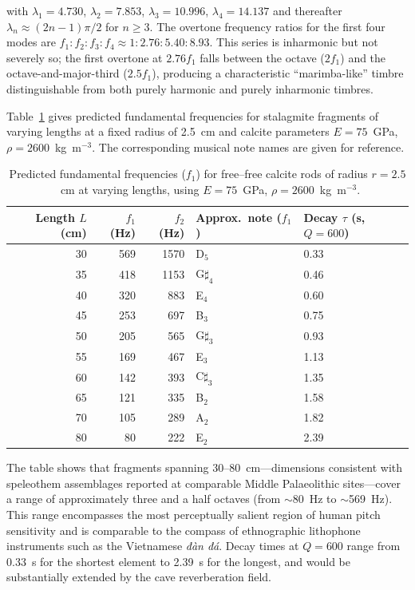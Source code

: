 \documentclass[12pt]{article}
\begin{document}
with $\lambda_1 = 4.730$, $\lambda_2 = 7.853$, $\lambda_3 = 10.996$, $\lambda_4 = 14.137$ and thereafter $\lambda_n \approx (2n-1)\pi/2$ for $n \geq 3$. The overtone frequency ratios for the first four modes are $f_1 : f_2 : f_3 : f_4 \approx 1 : 2.76 : 5.40 : 8.93$. This series is inharmonic but not severely so; the first overtone at $2.76f_1$ falls between the octave ($2f_1$) and the octave-and-major-third ($2.5f_1$), producing a characteristic ``marimba-like'' timbre distinguishable from both purely harmonic and purely inharmonic timbres.

Table~\ref{tab:freq} gives predicted fundamental frequencies for stalagmite fragments of varying lengths at a fixed radius of 2.5~cm and calcite parameters $E = 75$~GPa, $\rho = 2600$~kg~m$^{-3}$. The corresponding musical note names are given for reference.

\begin{table}[h]
\centering
\caption{Predicted fundamental frequencies ($f_1$) for free--free calcite rods of radius $r = 2.5$~cm at varying lengths, using $E = 75$~GPa, $\rho = 2600$~kg~m$^{-3}$.}
\label{tab:freq}
\begin{tabular}{@{}rrrll@{}}
\toprule
Length $L$ (cm) & $f_1$ (Hz) & $f_2$ (Hz) & Approx.\ note ($f_1$) & Decay $\tau$ (s, $Q=600$) \\
\midrule
30 & 569 & 1570 & D$_5$ & 0.33 \\
35 & 418 & 1153 & G$\sharp_4$ & 0.46 \\
40 & 320 & 883 & E$_4$ & 0.60 \\
45 & 253 & 697 & B$_3$ & 0.75 \\
50 & 205 & 565 & G$\sharp_3$ & 0.93 \\
55 & 169 & 467 & E$_3$ & 1.13 \\
60 & 142 & 393 & C$\sharp_3$ & 1.35 \\
65 & 121 & 335 & B$_2$ & 1.58 \\
70 & 105 & 289 & A$_2$ & 1.82 \\
80 & 80 & 222 & E$_2$ & 2.39 \\
\bottomrule
\end{tabular}
\end{table}

The table shows that fragments spanning 30--80~cm—dimensions consistent with speleothem assemblages reported at comparable Middle Palaeolithic sites—cover a range of approximately three and a half octaves (from $\sim$80~Hz to $\sim$569~Hz). This range encompasses the most perceptually salient region of human pitch sensitivity and is comparable to the compass of ethnographic lithophone instruments such as the Vietnamese \textit{đàn đá}. Decay times at $Q = 600$ range from 0.33~s for the shortest element to 2.39~s for the longest, and would be substantially extended by the cave reverberation field.
\end{document}

